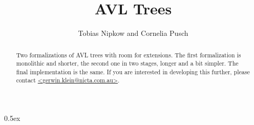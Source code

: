 \documentclass[11pt,a4paper]{article}
\begin{document}
\title{AVL Trees}
\author{Tobias Nipkow and Cornelia Pusch}
\maketitle

\begin{abstract}
  Two formalizations of AVL trees with room for extensions.  The first
  formalization is monolithic and shorter, the second one in two
  stages, longer and a bit simpler. The final implementation is the
  same.  If you are interested in developing this further, please
  contact \url{<gerwin.klein@nicta.com.au>}.
\end{abstract}

\tableofcontents

\parindent 0pt\parskip 0.5ex


\end{document}
